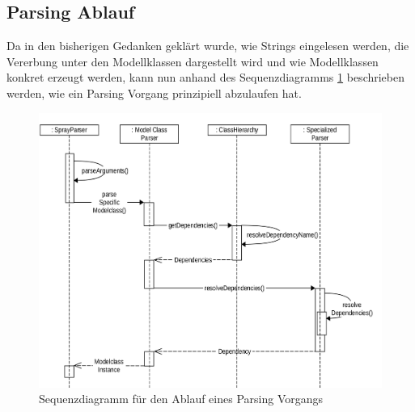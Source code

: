 \subsection{Parsing Ablauf}
Da in den bisherigen Gedanken geklärt wurde, wie Strings eingelesen werden, die Vererbung unter den Modellklassen dargestellt wird und wie Modellklassen konkret erzeugt werden, kann nun anhand des Sequenzdiagramms \ref{sequenzdiagrammAnsatz} beschrieben werden, wie ein Parsing Vorgang prinzipiell abzulaufen hat.\linebreak
\begin{figure}[htb]
	\hspace*{-0.5cm}
		\includegraphics[scale = 0.13]{Bilder/sequenzdiagrammAnsatzKomprimiertScaled(2500x2500).png}
		\caption{Sequenzdiagramm für den Ablauf eines Parsing Vorgangs}
		\label{sequenzdiagrammAnsatz}

\end{figure}
